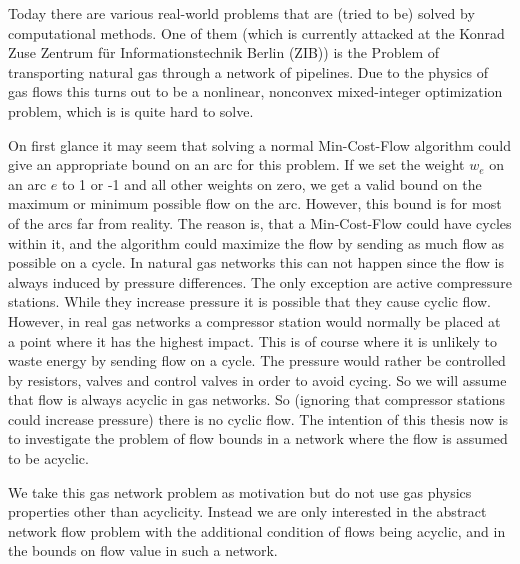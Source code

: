 
Today there are various real-world problems that are (tried to be) solved by computational methods. One of them (which 
is currently attacked at the Konrad Zuse Zentrum für Informationstechnik Berlin (ZIB)) is the Problem of transporting 
natural gas through a network of pipelines. Due to the physics of gas flows this turns out to be a nonlinear, nonconvex 
mixed-integer optimization problem, which is is quite hard to solve. 

On first glance it may seem that solving a normal Min-Cost-Flow algorithm could give an appropriate bound 
on an arc for this problem. If we set the weight $w_e$ on an arc $e$ to 1 or -1 and all other weights on zero, we get 
a valid bound on the maximum or minimum possible flow on the arc. However, this bound is for most of the arcs far from 
reality. The reason is, that a Min-Cost-Flow could have cycles within it, and the algorithm could maximize the flow by 
sending as much flow as possible on a cycle. In natural gas networks this can not happen since the flow is 
always induced by pressure differences. The only exception are active compressure stations. While they increase 
pressure it is possible that they cause cyclic flow. However, in real gas networks a compressor station would normally 
be placed at a point where it has the highest impact. This is of course where it is unlikely to waste energy by sending 
flow on a cycle. The pressure would rather be controlled by resistors, valves and control valves in order to avoid 
cycing. So we will assume that flow is always acyclic in gas networks.
So (ignoring that compressor stations could increase pressure) there is no cyclic flow. The intention of this thesis now 
is to investigate the problem of flow bounds in a network where the flow is assumed to be acyclic. 

We take this gas network problem as motivation but do not use gas physics properties other than acyclicity. Instead we 
are only interested in the abstract network flow problem with the additional condition of flows being acyclic, and 
in the bounds on flow value in such a network. 


